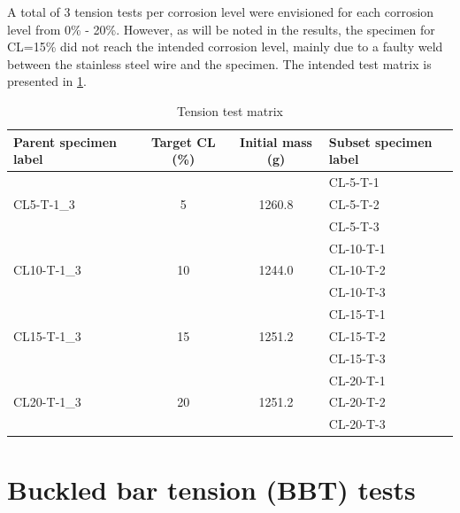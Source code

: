 A total of 3 tension tests per corrosion level were envisioned for each corrosion level from 0\% - 20\%. However, as will be noted in the results, the specimen for CL=15\% did not reach the intended corrosion level, mainly due to a faulty weld between the stainless steel wire and the specimen. The intended test matrix is presented in \ref{tab:tension_matrix}.

\begin{table}[htbp]
\caption{Tension test matrix}
\label{tab:tension_matrix}
\centering
\begin{tabular}{lccl}
Parent specimen label        & Target CL (\%)      & Initial mass (g)        & Subset specimen label \\ \hline
\multirow{3}{*}{CL5-T-1\_3}  & \multirow{3}{*}{5}  & \multirow{3}{*}{1260.8} & CL-5-T-1              \\
                             &                     &                         & CL-5-T-2              \\
                             &                     &                         & CL-5-T-3              \\
\multirow{3}{*}{CL10-T-1\_3} & \multirow{3}{*}{10} & \multirow{3}{*}{1244.0} & CL-10-T-1             \\
                             &                     &                         & CL-10-T-2             \\
                             &                     &                         & CL-10-T-3             \\
\multirow{3}{*}{CL15-T-1\_3} & \multirow{3}{*}{15} & \multirow{3}{*}{1251.2} & CL-15-T-1             \\
                             &                     &                         & CL-15-T-2             \\
                             &                     &                         & CL-15-T-3             \\
\multirow{3}{*}{CL20-T-1\_3} & \multirow{3}{*}{20} & \multirow{3}{*}{1251.2} & CL-20-T-1             \\
                             &                     &                         & CL-20-T-2             \\
                             &                     &                         & CL-20-T-3            
\end{tabular}
\end{table}

\section{Buckled bar tension (BBT) tests}

